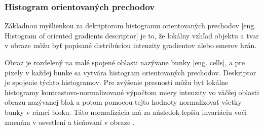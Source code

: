 \subsubsection{Histogram orientovaných prechodov}
Základnou myšlienkou za dekriptorom histogramu orientovaných prechodov [eng. Histogram of oriented gradients descriptor] je to, že lokálny vzhľad objektu a tvar v obraze môžu byť popísané
	distribúciou intenzity gradientov alebo smerov hrán.

Obraz je rozdelený na malé spojené oblasti nazývane bunky [eng. cells], a pre pixely v každej bunke sa vytvára histogram orientovaných prechodov.
Deskriptor je spojenie týchto histogramov.
Pre zvýšenie presnosti môžu byť lokálne histogramy kontrastovo-normalizované výpočtom miery intenzity vo väčšej oblasti obrazu nazývanej blok a potom
	pomocou tejto hodnoty normalizovať všetky bunky v rámci bloku.
Táto normalizácia má za následok lepšiu invariáciu voči zmenám v osvetlení a tieňovaní v obraze \cite{prop:HOG}.

\begin{comment}
	\subsubsection{Priemerna štandartná odchýlka vstupných údajov}
	Je užitočné vytvoriť si tzv. ``stredný obraz'' získaný priemernými hodnotami pre každý pixel zo všetkých trénovacích dát.
	Timto spôsobom je možné vytvoriť si základny prehľad o štruktúre vstupných dát.
	Na základe toho môžeme potom do vstupným dát pridať rôzne dalšie variácie klasifikovaných objektov pre lepšie generalizovanie klasifikátora \cite{odkaz:NNPreprocessing}.
\end{comment}
